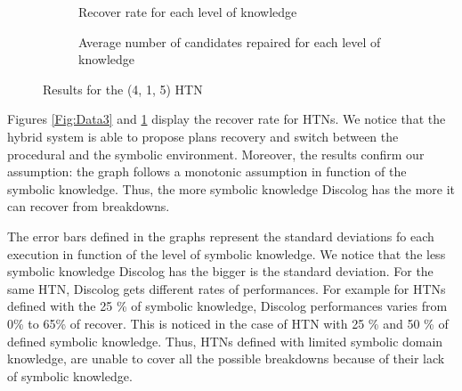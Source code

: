 \documentclass[conference]{IEEEtran}
\begin{document}
			\begin{figure}[t]
				\centering
				\begin{subfigure}[b]{0.5 \columnwidth}            
					\caption{ Recover rate for each level of knowledge}
					\label{Fig:Data1}
				\end{subfigure}
				\hspace{1cm}
				\begin{subfigure}[b]{0.5 \columnwidth}
					\centering
					\caption{Average number of candidates repaired for each level of knowledge}
					\label{Fig:Data2}
				\end{subfigure}
				\caption{Results for the (4, 1, 5) HTN}\label{fig:TOF2}
			\end{figure}	
	\par  Figures \ref{Fig:Data3} and  \ref{Fig:Data1} display the recover rate for HTNs. We notice that the hybrid system is able to propose plans recovery and switch between the procedural and the symbolic environment. Moreover, the results confirm our assumption: the graph follows a monotonic assumption in function of the symbolic knowledge. Thus, the more symbolic knowledge Discolog has the more it can recover from breakdowns. 

	The error bars defined in the graphs represent the standard deviations fo each execution in function of the level of symbolic knowledge.  We notice that the less symbolic knowledge Discolog has the bigger is the standard deviation.  For the same HTN, Discolog gets different rates of performances. For example for HTNs defined with the 25 \% of symbolic knowledge, Discolog performances varies from  0\% to 65\%  of recover. This is noticed in the case of HTN with 25 \% and 50 \% of defined symbolic knowledge. Thus, HTNs  defined with limited symbolic domain knowledge, are unable to cover all the possible breakdowns because of their lack of symbolic knowledge. 
	
\end{document}
